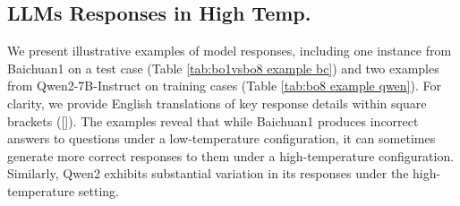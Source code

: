 \subsection{LLMs Responses in High Temp.}
\label{cha:BO8 cases}
We present illustrative examples of model responses, including one instance from Baichuan1 on a test case (Table \ref{tab:bo1vsbo8 example bc}) and two examples from Qwen2-7B-Instruct on training cases (Table \ref{tab:bo8 example qwen}). For clarity, we provide English translations of key response details within square brackets ([]). The examples reveal that while Baichuan1 produces incorrect answers to questions under a low-temperature configuration, it can sometimes generate more correct responses to them under a high-temperature configuration. Similarly, Qwen2 exhibits substantial variation in its responses under the high-temperature setting.

